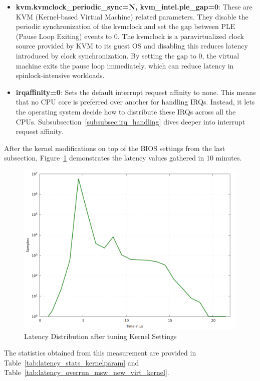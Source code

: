 \documentclass[MMR,Master,english]{twbook}
\begin{document}
\begin{itemize}
	\item \textbf{kvm.kvmclock\_periodic\_sync=N, kvm\_intel.ple\_gap=0}: These are KVM (Kernel-based Virtual Machine) related parameters. They disable the periodic synchronization of the kvmclock and set the gap between PLE (Pause Loop Exiting) events to 0. The kvmclock is a paravirtualized clock source provided by KVM to its guest OS and disabling this reduces latency introduced by clock synchronization. By setting the gap to 0, the virtual machine exits the pause loop immediately, which can reduce latency in spinlock-intensive workloads.
	\item \textbf{irqaffinity=0}: Sets the default interrupt request affinity to none. This means that no CPU core is preferred over another for handling IRQs. Instead, it lets the operating system decide how to distribute these IRQs across all the CPUs. Subsubsection~\ref{subsubsec:irq_handling} dives deeper into interrupt request affinity.
\end{itemize}
\clearpage
\noindent After the kernel modifications on top of the BIOS settings from the last subsection, Figure~\ref{fig:gnuplot_max_latency_rt_kernelparam} demonstrates the latency
values gathered in 10 minutes.

\begin{figure}[H]
	\centering
	\includegraphics[width=0.7\columnwidth]{masterthesis-documentation/docs/sigmatek/xenomai/4rt_kernelparam/gnuplot_max_latency_rt_kernelparam.png}
	\caption[Latency Distribution after tuning Kernel Settings]{Latency Distribution after tuning Kernel Settings}
	\label{fig:gnuplot_max_latency_rt_kernelparam}
\end{figure}

\noindent The statistics obtained from this measurement are provided in Table~\ref{tab:latency_stats_kernelparam} and Table~\ref{tab:latency_overrun_msw_new_virt_kernel}. 
\end{document}
